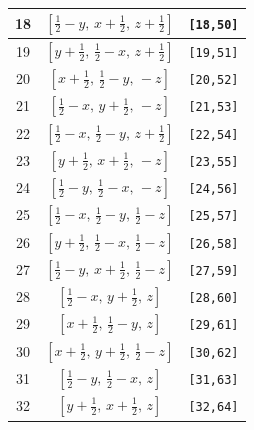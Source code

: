 \documentclass[fleqn,8pt]{jsarticle}
\begin{document}
\begin{longtable}{ccc}
18 & $\left[ \frac{1}{2} - y,\, x + \frac{1}{2},\, z + \frac{1}{2} \right]$ & {\tt [18,50]} \\ \hline
19 & $\left[ y + \frac{1}{2},\, \frac{1}{2} - x,\, z + \frac{1}{2} \right]$ & {\tt [19,51]} \\ \hline
20 & $\left[ x + \frac{1}{2},\, \frac{1}{2} - y,\, - z \right]$ & {\tt [20,52]} \\ \hline
21 & $\left[ \frac{1}{2} - x,\, y + \frac{1}{2},\, - z \right]$ & {\tt [21,53]} \\ \hline
22 & $\left[ \frac{1}{2} - x,\, \frac{1}{2} - y,\, z + \frac{1}{2} \right]$ & {\tt [22,54]} \\ \hline
23 & $\left[ y + \frac{1}{2},\, x + \frac{1}{2},\, - z \right]$ & {\tt [23,55]} \\ \hline
24 & $\left[ \frac{1}{2} - y,\, \frac{1}{2} - x,\, - z \right]$ & {\tt [24,56]} \\ \hline
25 & $\left[ \frac{1}{2} - x,\, \frac{1}{2} - y,\, \frac{1}{2} - z \right]$ & {\tt [25,57]} \\ \hline
26 & $\left[ y + \frac{1}{2},\, \frac{1}{2} - x,\, \frac{1}{2} - z \right]$ & {\tt [26,58]} \\ \hline
27 & $\left[ \frac{1}{2} - y,\, x + \frac{1}{2},\, \frac{1}{2} - z \right]$ & {\tt [27,59]} \\ \hline
28 & $\left[ \frac{1}{2} - x,\, y + \frac{1}{2},\, z \right]$ & {\tt [28,60]} \\ \hline
29 & $\left[ x + \frac{1}{2},\, \frac{1}{2} - y,\, z \right]$ & {\tt [29,61]} \\ \hline
30 & $\left[ x + \frac{1}{2},\, y + \frac{1}{2},\, \frac{1}{2} - z \right]$ & {\tt [30,62]} \\ \hline
31 & $\left[ \frac{1}{2} - y,\, \frac{1}{2} - x,\, z \right]$ & {\tt [31,63]} \\ \hline
32 & $\left[ y + \frac{1}{2},\, x + \frac{1}{2},\, z \right]$ & {\tt [32,64]} \\
\end{longtable}
\end{document}
